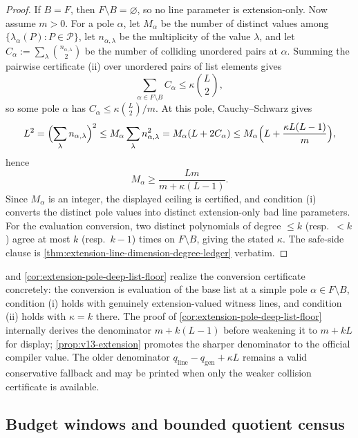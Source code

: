 \begin{proof}
If $B=F$, then $F\setminus B=\varnothing$, so no line parameter is extension-only.  Now assume $m>0$.  For a pole $\alpha$, let $M_\alpha$ be the number of distinct values among $\{\lambda_\alpha(P):P\in\mathcal P\}$, let $n_{\alpha,\lambda}$ be the multiplicity of the value $\lambda$, and let $C_\alpha:=\sum_\lambda\binom{n_{\alpha,\lambda}}2$ be the number of colliding unordered pairs at $\alpha$.  Summing the pairwise certificate \textup{(ii)} over unordered pairs of list elements gives
\[
        \sum_{\alpha\in F\setminus B}C_\alpha
        \le \kappa\binom L2 ,
\]
so some pole $\alpha$ has $C_\alpha\le \kappa\binom L2/m$.  At this pole, Cauchy--Schwarz gives
\[
        L^2
        =\Bigl(\sum_\lambda n_{\alpha,\lambda}\Bigr)^2
        \le
        M_\alpha\sum_\lambda n_{\alpha,\lambda}^2
        =M_\alpha(L+2C_\alpha)
        \le
        M_\alpha\Bigl(L+\frac{\kappa L(L-1)}m\Bigr),
\]
hence
\[
        M_\alpha\ge \frac{Lm}{m+\kappa(L-1)} .
\]
Since $M_\alpha$ is an integer, the displayed ceiling is certified, and condition \textup{(i)} converts the distinct pole values into distinct extension-only bad line parameters.  For the evaluation conversion, two distinct polynomials of degree $\le k$ \textup(resp.\ $<k$\textup) agree at most $k$ \textup(resp.\ $k-1$\textup) times on $F\setminus B$, giving the stated $\kappa$.  The safe-side clause is \cref{thm:extension-line-dimension-degree-ledger} verbatim.
\end{proof}

\begin{remark}\label{rem:v13-extension-v12}
 and \cref{cor:extension-pole-deep-list-floor} realize the conversion certificate concretely: the conversion is evaluation of the base list at a simple pole $\alpha\in F\setminus B$, condition \textup{(i)} holds with genuinely extension-valued witness lines, and condition \textup{(ii)} holds with $\kappa=k$ there.  The proof of \cref{cor:extension-pole-deep-list-floor} internally derives the denominator $m+k(L-1)$ before weakening it to $m+kL$ for display; \cref{prop:v13-extension} promotes the sharper denominator to the official compiler value.  The older denominator $q_{\mathrm{line}}-q_{\mathrm{gen}}+\kappa L$ remains a valid conservative fallback and may be printed when only the weaker collision certificate is available.
\end{remark}

\subsection{Budget windows and bounded quotient census}

